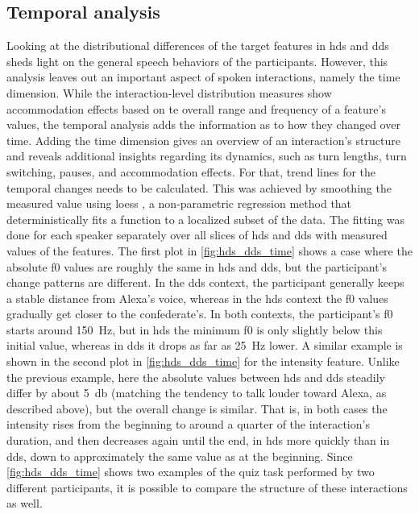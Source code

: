 \subsection{Temporal analysis}
\label{subsec:temporal_analysis}

Looking at the distributional differences of the target features in \ac{hds} and \ac{dds} sheds light on the general speech behaviors of the participants.
However, this analysis leaves out an important aspect of spoken interactions, namely the time dimension.
While the interaction-level distribution measures show accommodation effects based on te overall range and frequency of a feature's values, the temporal analysis adds the information as to how they changed over time.
Adding the time dimension gives an overview of an interaction's structure and reveals additional insights regarding its dynamics, such as turn lengths, turn switching, pauses, and accommodation effects.
For that, trend lines for the temporal changes needs to be calculated.
This was achieved by smoothing the measured value using \ac{loess} \citep{Cleveland1988locally}, a non-parametric regression method that deterministically fits a function to a localized subset of the data.
The fitting was done for each speaker separately over all slices of \ac{hds} and \ac{dds} with measured values of the features.
The first plot in \cref{fig:hds_dds_time} shows a case where the absolute \ac{f0} values are roughly the same in \ac{hds} and \ac{dds}, but the participant's change patterns are different.
In the \ac{dds} context, the participant generally keeps a stable distance from Alexa's voice, whereas in the \ac{hds} context the \ac{f0} values gradually get closer to the confederate's.
In both contexts, the participant's \ac{f0} starts around \SI{150}{\hertz}, but in \ac{hds} the minimum \ac{f0} is only slightly below this initial value, whereas in \ac{dds} it drops as far as \SI{25}{\hertz} lower.
A similar example is shown in the second plot in \cref{fig:hds_dds_time} for the intensity feature.
Unlike the previous example, here the absolute values between \ac{hds} and \ac{dds} steadily differ by about \SI{5}{\decibel} (matching the tendency to talk louder toward Alexa, as described above), but the overall change is similar.
That is, in both cases the intensity rises from the beginning to around a quarter of the interaction's duration, and then decreases again until the end, in \ac{hds} more quickly than in \ac{dds}, down to approximately the same value as at the beginning.
Since \cref{fig:hds_dds_time} shows two examples of the quiz task performed by two different participants, it is possible to compare the structure of these interactions as well.
